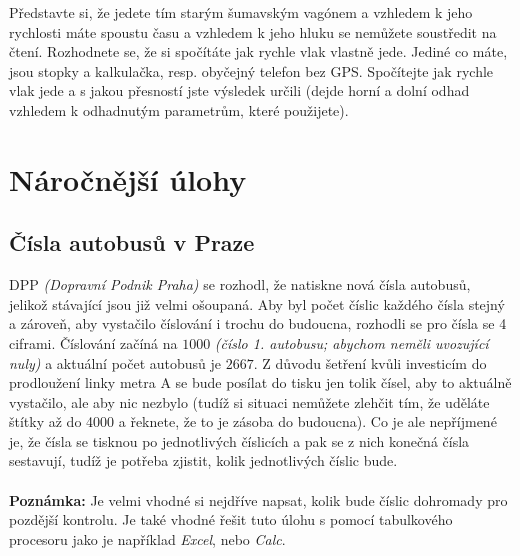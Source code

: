 \documentclass[a4paper,12pt]{article}
\begin{document}
Představte si, že jedete tím starým šumavským vagónem a vzhledem k jeho rychlosti máte spoustu času a vzhledem k jeho hluku se nemůžete soustředit na čtení. Rozhodnete se, že si spočítáte jak rychle vlak vlastně jede. Jediné co máte, jsou stopky a kalkulačka, resp. obyčejný telefon bez GPS. Spočítejte jak rychle vlak jede a s jakou přesností jste výsledek určili (dejde horní a dolní odhad vzhledem k odhadnutým parametrům, které použijete).

\section{Náročnější úlohy}

\subsection{Čísla autobusů v Praze}

DPP \textit{(Dopravní Podnik Praha)} se rozhodl, že natiskne nová čísla autobusů, jelikož stávající jsou již velmi ošoupaná. Aby byl počet číslic každého čísla stejný a zároveň, aby vystačilo číslování i trochu do budoucna, rozhodli se pro čísla se 4 ciframi. Číslování začíná na $1000$ \textit{(číslo 1. autobusu; abychom neměli uvozující nuly)} a aktuální počet autobusů je $2667$. Z důvodu šetření kvůli investicím do prodloužení linky metra A se bude posílat do tisku jen tolik čísel, aby to aktuálně vystačilo, ale aby nic nezbylo (tudíž si situaci nemůžete zlehčit tím, že uděláte štítky až do 4000 a řeknete, že to je zásoba do budoucna). Co je ale nepříjmené je, že čísla se tisknou po jednotlivých číslicích a pak se z nich konečná čísla sestavují, tudíž je potřeba zjistit, kolik jednotlivých číslic bude.
\\ \\
\textbf{Poznámka:} Je velmi vhodné si nejdříve napsat, kolik bude číslic dohromady pro pozdější kontrolu. Je také vhodné řešit tuto úlohu s pomocí tabulkového procesoru jako je například \textit{Excel}, nebo \textit{Calc}.
\end{document}
